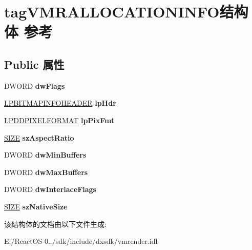 \hypertarget{structtag_v_m_r_a_l_l_o_c_a_t_i_o_n_i_n_f_o}{}\section{tag\+V\+M\+R\+A\+L\+L\+O\+C\+A\+T\+I\+O\+N\+I\+N\+F\+O结构体 参考}
\label{structtag_v_m_r_a_l_l_o_c_a_t_i_o_n_i_n_f_o}
\subsection*{Public 属性}
\begin{DoxyCompactItemize}
\item 
\mbox{\label{structtag_v_m_r_a_l_l_o_c_a_t_i_o_n_i_n_f_o_a89564fef00402a790351de6a9a0315c5}} 
D\+W\+O\+RD {\bfseries dw\+Flags}
\item 
\mbox{\label{structtag_v_m_r_a_l_l_o_c_a_t_i_o_n_i_n_f_o_af402378f0609a6c6cfe3c2ee77285017}} 
\hyperlink{struct_b_i_t_m_a_p_i_n_f_o_h_e_a_d_e_r}{L\+P\+B\+I\+T\+M\+A\+P\+I\+N\+F\+O\+H\+E\+A\+D\+ER} {\bfseries lp\+Hdr}
\item 
\mbox{\label{structtag_v_m_r_a_l_l_o_c_a_t_i_o_n_i_n_f_o_abe948a2a7d031d07cb2f059fee8ac6e5}} 
\hyperlink{interfacevoid}{L\+P\+D\+D\+P\+I\+X\+E\+L\+F\+O\+R\+M\+AT} {\bfseries lp\+Pix\+Fmt}
\item 
\mbox{\label{structtag_v_m_r_a_l_l_o_c_a_t_i_o_n_i_n_f_o_abb0aeadf861fa01986df6dce19883900}} 
\hyperlink{structtag_s_i_z_e}{S\+I\+ZE} {\bfseries sz\+Aspect\+Ratio}
\item 
\mbox{\label{structtag_v_m_r_a_l_l_o_c_a_t_i_o_n_i_n_f_o_a0d0aacc7091acbbe90eba706e6cb1128}} 
D\+W\+O\+RD {\bfseries dw\+Min\+Buffers}
\item 
\mbox{\label{structtag_v_m_r_a_l_l_o_c_a_t_i_o_n_i_n_f_o_a6bc0c6bc161681aa3981e4be969bf1c0}} 
D\+W\+O\+RD {\bfseries dw\+Max\+Buffers}
\item 
\mbox{\label{structtag_v_m_r_a_l_l_o_c_a_t_i_o_n_i_n_f_o_ad329cbfed9cfdf9f896b53ecfc8e2909}} 
D\+W\+O\+RD {\bfseries dw\+Interlace\+Flags}
\item 
\mbox{\label{structtag_v_m_r_a_l_l_o_c_a_t_i_o_n_i_n_f_o_a6dc4a30da120a9ecfcb5a06828f52cf5}} 
\hyperlink{structtag_s_i_z_e}{S\+I\+ZE} {\bfseries sz\+Native\+Size}
\end{DoxyCompactItemize}


该结构体的文档由以下文件生成\+:\begin{DoxyCompactItemize}
\item 
E\+:/\+React\+O\+S-\/0../sdk/include/dxsdk/vmrender.\+idl\end{DoxyCompactItemize}
